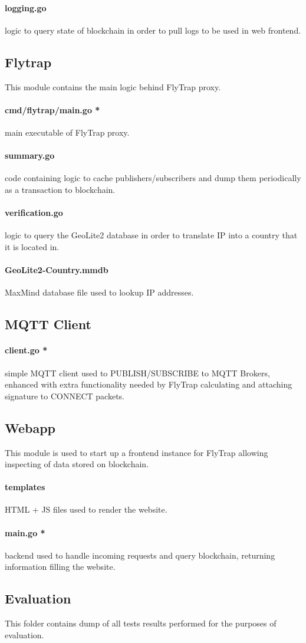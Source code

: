 \paragraph{logging.go} logic to query state of blockchain in order to pull logs to be used in web frontend.
\subsection{Flytrap}
This module contains the main logic behind FlyTrap proxy. 
\paragraph{cmd/flytrap/main.go *} main executable of FlyTrap proxy.
\paragraph{summary.go} code containing logic to cache publishers/subscribers and dump them periodically as a transaction to blockchain.
\paragraph{verification.go} logic to query the GeoLite2 database in order to translate IP into a country that it is located in.
\paragraph{GeoLite2-Country.mmdb} MaxMind database file used to lookup IP addresses.
\subsection{MQTT Client}
\paragraph{client.go *} simple MQTT client used to PUBLISH/SUBSCRIBE to MQTT Brokers, enhanced with extra functionality needed by FlyTrap calculating and attaching signature to CONNECT packets.
\subsection{Webapp}
This module is used to start up a frontend instance for FlyTrap allowing inspecting of data stored on blockchain.
\paragraph{templates} HTML + JS files used to render the website.
\paragraph{main.go *} backend used to handle incoming requests and query blockchain, returning information filling the website.
\subsection{Evaluation}
This folder contains dump of all tests results performed for the purposes of evaluation.
